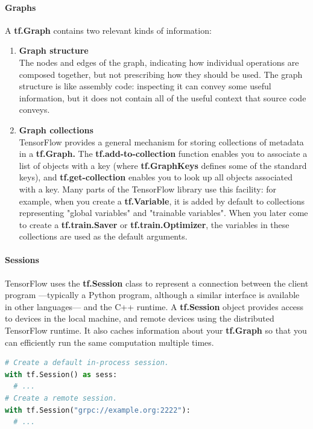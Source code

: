\paragraph{Graphs}
A \textbf{tf.Graph} contains two relevant kinds of information:
\begin{enumerate}
      \item\textbf{Graph structure}\\
      The nodes and edges of the graph, indicating how individual operations are composed together, but not prescribing how they should be used. The graph structure is like assembly code: inspecting it can convey some useful information, but it does not contain all of the useful context that source code conveys.
      
      \item\textbf{Graph collections}\\
      TensorFlow provides a general mechanism for storing collections of metadata in a \textbf{tf.Graph.} The \textbf{tf.add-to-collection} function enables you to associate a list of objects with a key (where \textbf{tf.GraphKeys} defines some of the standard keys), and \textbf{tf.get-collection} enables you to look up all objects associated with a key. Many parts of the TensorFlow library use this facility: for example, when you create a \textbf{tf.Variable}, it is added by default to collections representing "global variables" and "trainable variables". When you later come to create a \textbf{tf.train.Saver} or \textbf{tf.train.Optimizer}, the variables in these collections are used as the default arguments.
      
\end{enumerate}

\paragraph{Sessions}
    TensorFlow uses the \textbf{tf.Session} class to represent a connection between the client program ---typically a Python program, although a similar interface is available in other languages--- and the C++ runtime. A \textbf{tf.Session} object provides access to devices in the local machine, and remote devices using the distributed TensorFlow runtime. It also caches information about your \textbf{tf.Graph} so that you can efficiently run the same computation multiple times.\\
    \begin{lstlisting}[language=Python]
# Create a default in-process session.
with tf.Session() as sess:
  # ...
# Create a remote session.
with tf.Session("grpc://example.org:2222"):
  # ...

\end{lstlisting}

